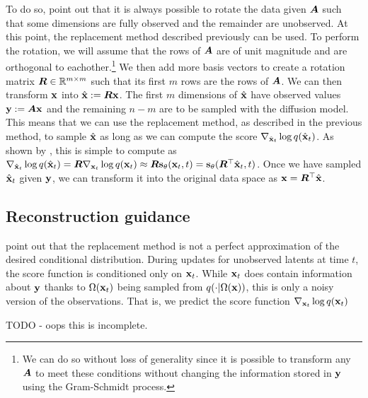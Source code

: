 To do so, \citet{song2020score} point out that it is always possible to rotate the data given ${\bm{A}}$ such that some dimensions are fully observed and the remainder are unobserved. At this point, the replacement method described previously can be used. To perform the rotation, we will assume that the rows of ${\bm{A}}$ are of unit magnitude and are orthogonal to eachother.\footnote{We can do so without loss of generality since it is possible to transform any ${\bm{A}}$ to meet these conditions without changing the information stored in ${\mathbf{y}}$ using the Gram-Schmidt process.} We then add more basis vectors to create a rotation matrix ${\bm{R}} \in \mathbb{R}^{m \times m}$ such that its first $m$ rows are the rows of ${\bm{A}}$. We can then transform ${\mathbf{x}}$ into $\hat{{\mathbf{x}}} := {\bm{R}} {\mathbf{x}}$. The first $m$ dimensions of $\hat{{\mathbf{x}}}$ have observed values ${\mathbf{y}} := {\bm{A}}{\mathbf{x}}$ and the remaining $n-m$ are to be sampled with the diffusion model. This means that we can use the replacement method, as described in the previous method, to sample $\hat{{\mathbf{x}}}$ as long as we can compute the score $\nabla_{\hat{{\mathbf{x}}}_t} \log q(\hat{{\mathbf{x}}}_t)$. As shown by \citet{song2020score}, this is simple to compute as $\nabla_{\hat{{\mathbf{x}}}_t} \log q(\hat{{\mathbf{x}}}_t) = {\bm{R}} \nabla_{{\mathbf{x}}_t} \log q({\mathbf{x}}_t) \approx {\bm{R}} {\mathbf{s}}_\theta({\mathbf{x}}_t, t) = {\mathbf{s}}_\theta({\bm{R}}^\top \hat{{\mathbf{x}}}_t, t)$. Once we have sampled $\hat{{\mathbf{x}}}_t$ given ${\mathbf{y}}$, we can transform it into the original data space as ${\mathbf{x}} = {\bm{R}}^\top \hat{{\mathbf{x}}}$.

\subsection{Reconstruction guidance}
\citet{ho2022video} point out that the replacement method is not a perfect approximation of the desired conditional distribution. During updates for unobserved latents at time $t$, the score function is conditioned only on ${\mathbf{x}}_t$. While ${\mathbf{x}}_t$ does contain information about ${\mathbf{y}}$ thanks to $\Omega({\mathbf{x}}_t)$ being sampled from $q(\cdot | \Omega({\mathbf{x}}))$, this is only a noisy version of the observations. That is, we predict the score function $\nabla_{{\mathbf{x}}_t} \log q({\mathbf{x}}_t)$ 

TODO - oops this is incomplete.

